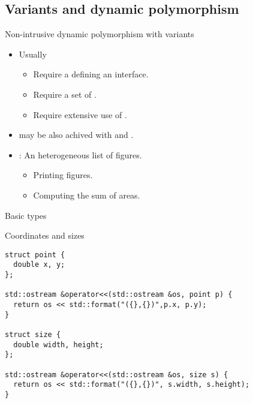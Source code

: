 \subsection{Variants and dynamic polymorphism}

\begin{frame}[t,fragile]{Non-intrusive dynamic polymorphism with variants}
\begin{itemize}
  \item Usually  
    \begin{itemize}
      \item Require a  defining an interface.
      \item Require a set of .
      \item Require extensive use of .
    \end{itemize}

  \item {} may be also achived with 
         and .

  \item {}: An heterogeneous list of figures.
    \begin{itemize}
      \item Printing figures.
      \item Computing the sum of areas.
    \end{itemize}
\end{itemize}
\end{frame}

\begin{frame}[t,fragile]{Basic types}
\begin{block}{Coordinates and sizes}
\begin{lstlisting}
struct point {
  double x, y;
};

std::ostream &operator<<(std::ostream &os, point p) {
  return os << std::format("({},{})",p.x, p.y);
}

struct size {
  double width, height;
};

std::ostream &operator<<(std::ostream &os, size s) {
  return os << std::format("({},{})", s.width, s.height);
}
\end{lstlisting}
\end{block}
\end{frame}

